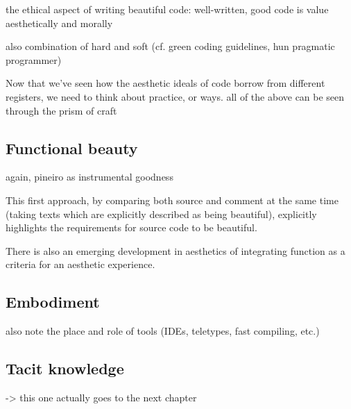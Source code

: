 

the ethical aspect of writing beautiful code: well-written, good code is value aesthetically and morally

also combination of hard and soft (cf. green coding guidelines, hun pragmatic programmer)

Now that we've seen how the aesthetic ideals of code borrow from different registers, we need to think about practice, or ways. all of the above can be seen through the prism of craft

\subsection{Functional beauty}

again, pineiro as instrumental goodness

This first approach, by comparing both source and comment at the same time (taking texts which are explicitly described as being beautiful), explicitly highlights the requirements for source code to be beautiful.

There is also an emerging development in aesthetics of integrating function as a criteria for an aesthetic experience.

\subsection{Embodiment}

also note the place and role of tools (IDEs, teletypes, fast compiling, etc.)

\subsection{Tacit knowledge}

-> this one actually goes to the next chapter

